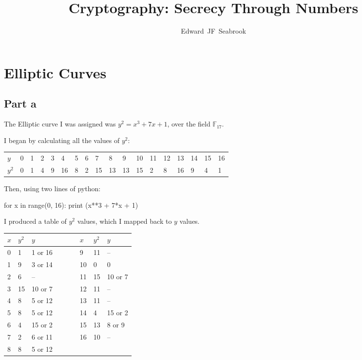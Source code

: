 \documentclass[11pt,a4paper,twoside]{article}
\begin{document}
\title{Cryptography: Secrecy Through Numbers}
\author{Edward~JF~Seabrook}

\maketitle

\section{Elliptic Curves}
\subsection{Part a}
The Elliptic curve I was assigned was $y^2 = x^3 + 7x + 1$, over the field $\mathbb{F}_{17}$. 

I began by calculating all the values of $y^2$:

\begin{table}[H]
\centering
\begin{tabular}{l|lllllllllllllllll}
$y$   & 0 & 1 & 2 & 3 & 4  & 5 & 6 & 7  & 8  & 9  & 10 & 11 & 12 & 13 & 14 & 15 & 16 \\
$y^2$ & 0 & 1 & 4 & 9 & 16 & 8 & 2 & 15 & 13 & 13 & 15 & 2  & 8  & 16 & 9  & 4  & 1 
\end{tabular}
\end{table}

Then, using two lines of python:

\begin{python}
for x in range(0, 16):
    print (x**3 + 7*x + 1) %
\end{python}

I produced a table of $y^2$ values, which I mapped back to $y$ values.\

\begin{table}[h]
\centering
\begin{tabular}{lllllllll}
$x$ & $y^2$ & $y$     & & & &  $x$ & $y^2$ & $y$     \\  \midrule
0   & 1     & 1 or 16 & & & & 9   & 11    & --      \\
1   & 9     & 3 or 14 & & & & 10  & 0     & 0       \\
2   & 6     & --      & & & & 11  & 15    & 10 or 7 \\
3   & 15    & 10 or 7 & & & & 12  & 11    & --      \\
4   & 8     & 5 or 12 & & & & 13  & 11    & --      \\
5   & 8     & 5 or 12 & & & & 14  & 4     & 15 or 2 \\
6   & 4     & 15 or 2 & & & & 15  & 13    & 8 or 9  \\
7   & 2     & 6 or 11 & & & & 16  & 10    & -- \\
8   & 8     & 5 or 12 
\end{tabular}
\end{table}
\end{document}
